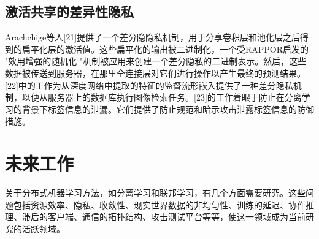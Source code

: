 \subsection{激活共享的差异性隐私}
Arachchige等人[21]提供了一个差分隐隐私机制，用于分享卷积层和池化层之后得到的扁平化层的激活值。这些扁平化的输出被二进制化，一个受RAPPOR启发的 "效用增强的随机化 "机制被应用来创建一个差分隐私的二进制表示。然后，这些数据被传送到服务器，在那里全连接层对它们进行操作以产生最终的预测结果。[22]中的工作为从深度网络中提取的特征的监督流形嵌入提供了一种差分隐私机制，以便从服务器上的数据库执行图像检索任务。[23]的工作着眼于防止在分离学习的背景下标签信息的泄漏。它们提供了防止规范和暗示攻击泄露标签信息的防御措施。

\section{未来工作}
关于分布式机器学习方法，如分离学习和联邦学习，有几个方面需要研究。这些问题包括资源效率、隐私、收敛性、现实世界数据的非均匀性、训练的延迟、协作推理、滞后的客户端、通信的拓扑结构、攻击测试平台等等，使这一领域成为当前研究的活跃领域。
